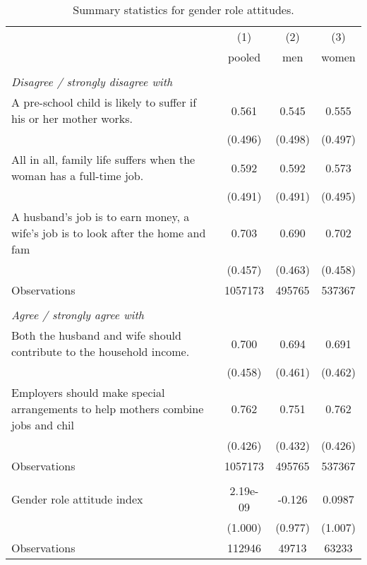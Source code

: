\begin{singlespace}
\begin{table}[h!]\centering\footnotesize
 \def\sym#1{\ifmmode^{#1}\else\(^{#1}\)\fi} 
\caption{Summary statistics for gender role attitudes.} 
\label{tab:sumgnorm} 
\begin{tabular}{l*{3}{c}} 
\hline\hline
                    &\multicolumn{1}{c}{(1)}&\multicolumn{1}{c}{(2)}&\multicolumn{1}{c}{(3)}\\
                    &\multicolumn{1}{c}{pooled}&\multicolumn{1}{c}{men}&\multicolumn{1}{c}{women}\\
\hline \\ \multicolumn{4}{l}{\textit{Disagree / strongly disagree with}} \\
A pre-school child is likely to suffer if his or her mother works.&       0.561         &       0.545         &       0.555         \\
                    &     (0.496)         &     (0.498)         &     (0.497)         \\
[1em]
All in all, family life suffers when the woman has a full-time job.&       0.592         &       0.592         &       0.573         \\
                    &     (0.491)         &     (0.491)         &     (0.495)         \\
[1em]
A husband's job is to earn money, a wife's job is to look after the home and fam&       0.703         &       0.690         &       0.702         \\
                    &     (0.457)         &     (0.463)         &     (0.458)         \\
\hline
Observations        &     1057173         &      495765         &      537367         \\
\hline \\ \multicolumn{4}{l}{\textit{Agree / strongly agree with}} \\ 
Both the husband and wife should contribute to the household income.&       0.700         &       0.694         &       0.691         \\
                    &     (0.458)         &     (0.461)         &     (0.462)         \\
[1em]
Employers should make special arrangements to help mothers combine jobs and chil&       0.762         &       0.751         &       0.762         \\
                    &     (0.426)         &     (0.432)         &     (0.426)         \\
\hline
Observations        &     1057173         &      495765         &      537367         \\
\hline \\  
Gender role attitude index&    2.19e-09         &      -0.126         &      0.0987         \\
                    &     (1.000)         &     (0.977)         &     (1.007)         \\
\hline
Observations        &      112946         &       49713         &       63233         \\
\hline\hline 
\end{tabular} 
\end{table} 
\end{singlespace}
